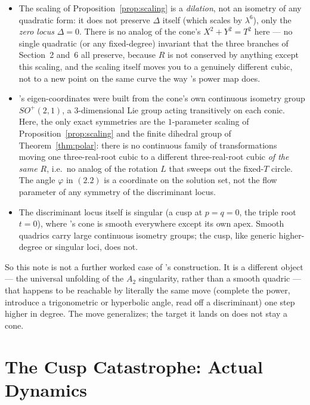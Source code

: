 \documentclass[11pt]{amsart}
\theoremstyle{remark}
\begin{document}
\begin{itemize}
\item The scaling of Proposition~\ref{prop:scaling} is a \emph{dilation}, not an isometry of any quadratic form: it does not preserve $\Delta$ itself (which scales by $\lambda^6$), only the \emph{zero locus} $\Delta=0$. There is no analog of the cone's $X^2+Y^2=T^2$ here --- no single quadratic (or any fixed-degree) invariant that the three branches of Section~2 and~6 all preserve, because $R$ is not conserved by anything except this scaling, and the scaling itself moves you to a genuinely different cubic, not to a new point on the same curve the way \cite{Ebert2026EigenCoord}'s power map does.
\item \cite{Ebert2026EigenCoord}'s eigen-coordinates were built from the cone's own continuous isometry group $SO^+(2,1)$, a $3$-dimensional Lie group acting transitively on each conic. Here, the only exact symmetries are the $1$-parameter scaling of Proposition~\ref{prop:scaling} and the finite dihedral group of Theorem~\ref{thm:polar}: there is no continuous family of transformations moving one three-real-root cubic to a different three-real-root cubic \emph{of the same $R$}, i.e.\ no analog of the rotation $L$ that sweeps out the fixed-$T$ circle. The angle $\varphi$ in $(2.2)$ is a coordinate on the solution set, not the flow parameter of any symmetry of the discriminant locus.
\item The discriminant locus itself is singular (a cusp at $p=q=0$, the triple root $t=0$), where \cite{Ebert2026EigenCoord}'s cone is smooth everywhere except its own apex. Smooth quadrics carry large continuous isometry groups; the cusp, like generic higher-degree or singular loci, does not.
\end{itemize}

So this note is not a further worked case of \cite{Ebert2026EigenCoord}'s construction. It is a different object --- the universal unfolding of the $A_2$ singularity, rather than a smooth quadric --- that happens to be reachable by literally the same move (complete the power, introduce a trigonometric or hyperbolic angle, read off a discriminant) one step higher in degree. The move generalizes; the target it lands on does not stay a cone.

\section{The Cusp Catastrophe: Actual Dynamics}\label{sec:dynamics}
\end{document}
